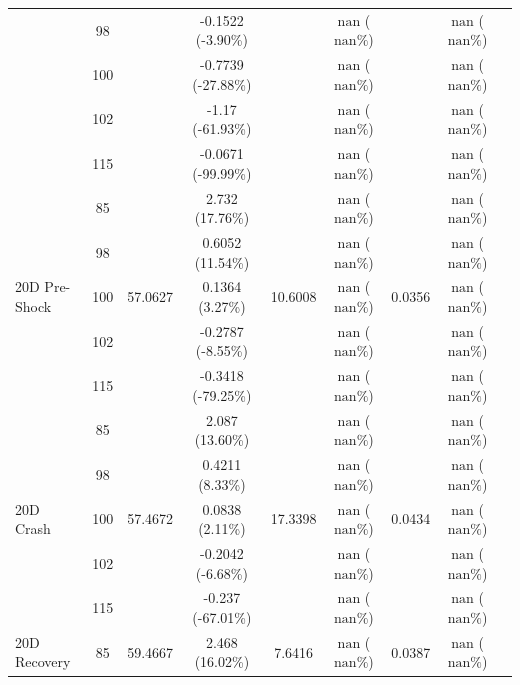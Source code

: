 \begin{table}[htbp]
{\begin{tabular}{lclcccccc}
    & 98 & & -0.1522 (-3.90\%) & & $\mathrm{nan}$ ($\mathrm{nan}\%$) & & $\mathrm{nan}$ ($\mathrm{nan}\%$) \\
    & 100 & & -0.7739 (-27.88\%) & & $\mathrm{nan}$ ($\mathrm{nan}\%$) & & $\mathrm{nan}$ ($\mathrm{nan}\%$) \\
    & 102 & & -1.17 (-61.93\%) & & $\mathrm{nan}$ ($\mathrm{nan}\%$) & & $\mathrm{nan}$ ($\mathrm{nan}\%$) \\
    & 115 & & -0.0671 (-99.99\%) & & $\mathrm{nan}$ ($\mathrm{nan}\%$) & & $\mathrm{nan}$ ($\mathrm{nan}\%$) \\
    \midrule
    \multirow{5}{*}{20D Pre-Shock}
    & 85 & \multirow{5}{*}{57.0627} & 2.732 (17.76\%) & \multirow{5}{*}{10.6008} & $\mathrm{nan}$ ($\mathrm{nan}\%$) & \multirow{5}{*}{0.0356} & $\mathrm{nan}$ ($\mathrm{nan}\%$) \\
    & 98 & & 0.6052 (11.54\%) & & $\mathrm{nan}$ ($\mathrm{nan}\%$) & & $\mathrm{nan}$ ($\mathrm{nan}\%$) \\
    & 100 & & 0.1364 (3.27\%) & & $\mathrm{nan}$ ($\mathrm{nan}\%$) & & $\mathrm{nan}$ ($\mathrm{nan}\%$) \\
    & 102 & & -0.2787 (-8.55\%) & & $\mathrm{nan}$ ($\mathrm{nan}\%$) & & $\mathrm{nan}$ ($\mathrm{nan}\%$) \\
    & 115 & & -0.3418 (-79.25\%) & & $\mathrm{nan}$ ($\mathrm{nan}\%$) & & $\mathrm{nan}$ ($\mathrm{nan}\%$) \\
    \midrule
    \multirow{5}{*}{20D Crash}
    & 85 & \multirow{5}{*}{57.4672} & 2.087 (13.60\%) & \multirow{5}{*}{17.3398} & $\mathrm{nan}$ ($\mathrm{nan}\%$) & \multirow{5}{*}{0.0434} & $\mathrm{nan}$ ($\mathrm{nan}\%$) \\
    & 98 & & 0.4211 (8.33\%) & & $\mathrm{nan}$ ($\mathrm{nan}\%$) & & $\mathrm{nan}$ ($\mathrm{nan}\%$) \\
    & 100 & & 0.0838 (2.11\%) & & $\mathrm{nan}$ ($\mathrm{nan}\%$) & & $\mathrm{nan}$ ($\mathrm{nan}\%$) \\
    & 102 & & -0.2042 (-6.68\%) & & $\mathrm{nan}$ ($\mathrm{nan}\%$) & & $\mathrm{nan}$ ($\mathrm{nan}\%$) \\
    & 115 & & -0.237 (-67.01\%) & & $\mathrm{nan}$ ($\mathrm{nan}\%$) & & $\mathrm{nan}$ ($\mathrm{nan}\%$) \\
    \midrule
    \multirow{5}{*}{20D Recovery}
    & 85 & \multirow{5}{*}{59.4667} & 2.468 (16.02\%) & \multirow{5}{*}{7.6416} & $\mathrm{nan}$ ($\mathrm{nan}\%$) & \multirow{5}{*}{0.0387} & $\mathrm{nan}$ ($\mathrm{nan}\%$) \\

\end{tabular}}
\end{table}
